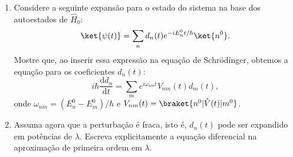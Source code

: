\begin{enumerate}
            \begin{enumerate}
                  \item Considere a seguinte expansão para o estado do sistema na base dos
                        autoestados de $\hat{H}_0$:
                        $$
                              \ket{\psi(t)} = \sum_n d_n(t) e^{-iE_n^0 t/\hbar} \ket{n^0}.
                        $$
                        Mostre que, ao inserir essa expressão na equação de Schrödinger,
                        obtemos a equação para os coeficientes $d_n(t)$:
                        $$
                              i\hbar \frac{\mathrm{d} d_n}{\mathrm{d}t} = \sum_m e^{i\omega_{nm} t} V_{nm}(t) d_m(t),
                        $$
                        onde $\omega_{nm} = (E_n^0 - E_m^0)/\hbar$ e $V_{nm}(t) = \braket{n^0 | \hat{V}(t) | m^0}$.
                  \item Assuma agora que a perturbação é fraca, isto é, $d_n(t)$ pode ser
                        expandido em potências de $\lambda$. Escreva explicitamente a equação
                        diferencial na aproximação de primeira ordem em $\lambda$.
            \end{enumerate}
\end{enumerate}


